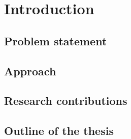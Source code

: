\chapter{Introduction}

\section{Problem statement}

\section{Approach}

\section{Research contributions}

\section{Outline of the thesis}
